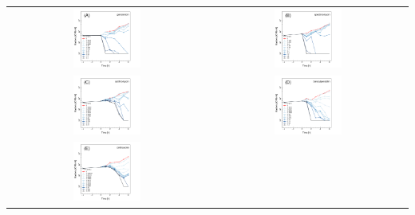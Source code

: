 \documentclass{article}
\begin{document}
\centering
\begin{center}

\begin{tabularx}{1\textwidth}{cc}
\includegraphics[trim = 0mm 0mm 0mm 0mm, clip,width=0.35\textwidth]{WT_Genregression} & 
\includegraphics[trim = 0mm 0mm 0mm 0mm, clip,width=0.35\textwidth]{WT_Specregression} \\
\includegraphics[trim = 0mm 0mm 0mm 0mm, clip,width=0.35\textwidth]{WT_AZregression}  &
\includegraphics[trim = 0mm 0mm 0mm 0mm, clip,width=0.35\textwidth]{WT_Penregression}  \\
\includegraphics[trim = 0mm 0mm 0mm 0mm, clip,width=0.35\textwidth]{WT_CTregression}&  

\end{tabularx}
\end{center}
\end{document}
